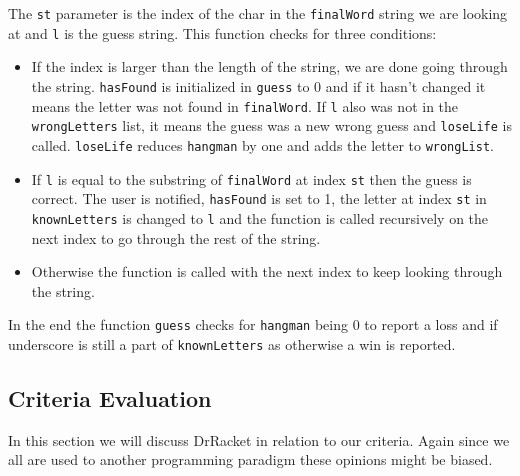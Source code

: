 The \lstinline!st! parameter is the index of the char in the \lstinline!finalWord! string we are looking at and \lstinline!l! is the guess string.
This function checks for three conditions:

\begin{itemize}
\item If the index is larger than the length of the string, we are done going through the string.
\lstinline!hasFound! is initialized in \lstinline!guess! to 0 and if it hasn't changed it means the letter was not found in \lstinline!finalWord!.
If \lstinline!l! also was not in the \lstinline!wrongLetters! list, it means the guess was a new wrong guess and \lstinline!loseLife! is called.
\lstinline!loseLife! reduces \lstinline!hangman! by one and adds the letter to \lstinline!wrongList!.
\item If \lstinline!l! is equal to the substring of \lstinline!finalWord! at index \lstinline!st! then the guess is correct.
The user is notified, \lstinline!hasFound! is set to 1, the letter at index \lstinline!st! in \lstinline!knownLetters! is changed to \lstinline!l! and the function is called recursively on the next index to go through the rest of the string.
\item Otherwise the function is called with the next index to keep looking through the string.
\end{itemize}

In the end the function \lstinline!guess! checks for \lstinline!hangman! being 0 to report a loss and if underscore is still a part of \lstinline!knownLetters! as otherwise a win is reported.

\subsection{Criteria Evaluation}
\label{subsec:criteval}
In this section we will discuss DrRacket in relation to our criteria. Again since we all are used to another programming paradigm these opinions might be biased.

